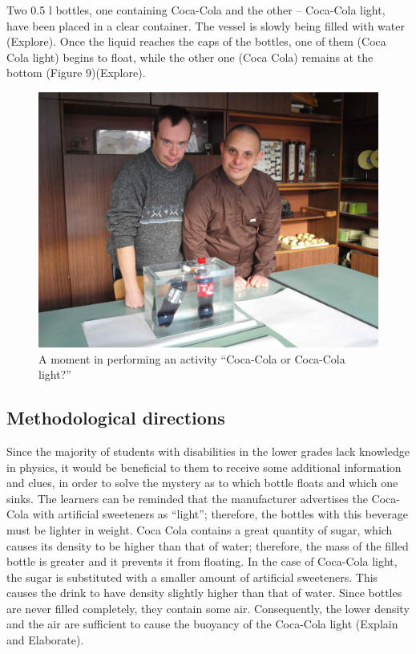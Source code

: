 \documentclass[11.5pt]{sig-alternate} %
\begin{document}
\begin{large}
Two 0.5 l bottles, one containing Coca-Cola and the other – Coca-Cola light, have been placed in a clear container. The vessel is slowly being filled with water (Explore). Once the liquid reaches the caps of the bottles, one of them (Coca Cola light) begins to float, while the other one (Coca Cola) remains at the bottom (Figure 9)(Explore).
 \newpage
\begin{figure}[h]
    \centering
    \includegraphics[width=0.95\linewidth]{images/fig9.jpg}
    \caption{A moment in performing an activity “Coca-Cola or Coca-Cola light?”}
\end{figure}

\subsection*{Methodological directions}

Since the majority of students with disabilities in the lower grades lack knowledge in physics, it would be beneficial to them to receive some additional information and clues, in order to solve the mystery as to which bottle floats and which one sinks. The learners can be reminded that the manufacturer advertises the Coca-Cola with artificial sweeteners as “light”; therefore, the bottles with this beverage must be lighter in weight. Coca Cola contains a great quantity of sugar, which causes its density to be higher than that of water; therefore, the mass of the filled bottle is greater and it prevents it from floating. In the case of Coca-Cola light, the sugar is substituted with a smaller amount of artificial sweeteners. This causes the drink to have density slightly higher than that of water. Since bottles are never filled completely, they contain some air. Consequently, the lower density and the air are sufficient to cause the buoyancy of the Coca-Cola light (Explain and Elaborate).


\end{large}
\end{document}
